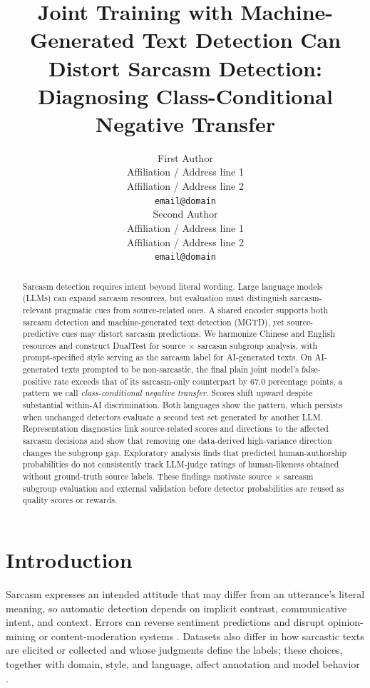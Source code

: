 \documentclass[11pt]{article}
\title{Joint Training with Machine-Generated Text Detection Can Distort Sarcasm Detection: Diagnosing Class-Conditional Negative Transfer}
\author{First Author \\
  Affiliation / Address line 1 \\
  Affiliation / Address line 2 \\
  \texttt{email@domain} \\\And
  Second Author \\
  Affiliation / Address line 1 \\
  Affiliation / Address line 2 \\
  \texttt{email@domain} \\}
\begin{document}
\maketitle

\begin{abstract}
Sarcasm detection requires intent beyond literal wording. Large language models (LLMs) can expand sarcasm resources, but evaluation must distinguish sarcasm-relevant pragmatic cues from source-related ones. A shared encoder supports both sarcasm detection and machine-generated text detection (MGTD), yet source-predictive cues may distort sarcasm predictions. We harmonize Chinese and English resources and construct DualTest for source $\times$ sarcasm subgroup analysis, with prompt-specified style serving as the sarcasm label for AI-generated texts. On AI-generated texts prompted to be non-sarcastic, the final plain joint model's false-positive rate exceeds that of its sarcasm-only counterpart by 67.0 percentage points, a pattern we call \emph{class-conditional negative transfer}. Scores shift upward despite substantial within-AI discrimination. Both languages show the pattern, which persists when unchanged detectors evaluate a second test set generated by another LLM. Representation diagnostics link source-related scores and directions to the affected sarcasm decisions and show that removing one data-derived high-variance direction changes the subgroup gap. Exploratory analysis finds that predicted human-authorship probabilities do not consistently track LLM-judge ratings of human-likeness obtained without ground-truth source labels. These findings motivate source $\times$ sarcasm subgroup evaluation and external validation before detector probabilities are reused as quality scores or rewards.
\end{abstract}

\section{Introduction}
\label{sec:intro}

Sarcasm expresses an intended attitude that may differ from an utterance's literal meaning, so automatic detection depends on implicit contrast, communicative intent, and context. Errors can reverse sentiment predictions and disrupt opinion-mining or content-moderation systems \citep{tay2018reasoning,vidgen2019challenges}. Datasets also differ in how sarcastic texts are elicited or collected and whose judgments define the labels; these choices, together with domain, style, and language, affect annotation and model behavior \citep{oprea2020isarcasm,casola2024multipico,jang2024csc}.
\end{document}
